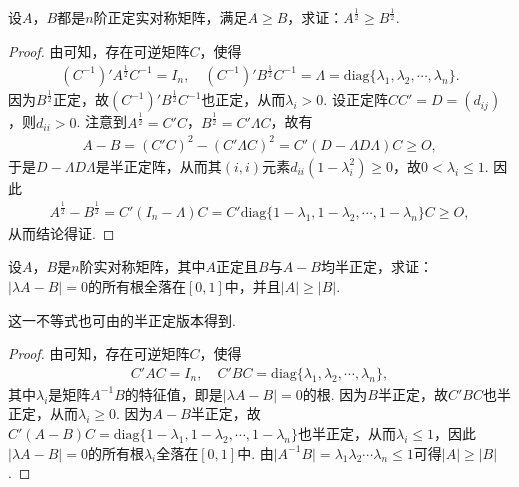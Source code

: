 \documentclass[../../main.tex]{subfiles}%
\begin{document}
\begin{example}\label{example:例9.79}
设\(A\)，\(B\)都是\(n\)阶正定实对称矩阵，满足\(A\geqslant  B\)，求证：\(A^{\frac{1}{2}}\geqslant  B^{\frac{1}{2}}\).
\end{example}
\begin{proof}
由可知，存在可逆矩阵\(C\)，使得
\begin{align*}
(C^{-1})'A^{\frac{1}{2}}C^{-1} = I_n,\quad (C^{-1})'B^{\frac{1}{2}}C^{-1} = \Lambda = \mathrm{diag}\{\lambda_1,\lambda_2,\cdots,\lambda_n\}.
\end{align*}
因为\(B^{\frac{1}{2}}\)正定，故\((C^{-1})'B^{\frac{1}{2}}C^{-1}\)也正定，从而\(\lambda_i>0\). 设正定阵\(CC' = D=(d_{ij})\)，则\(d_{ii}>0\). 注意到\(A^{\frac{1}{2}} = C'C\)，\(B^{\frac{1}{2}} = C'\Lambda C\)，故有
\begin{align*}
A - B=(C'C)^2-(C'\Lambda C)^2 = C'(D - \Lambda D\Lambda)C\geqslant  O,
\end{align*}
于是\(D - \Lambda D\Lambda\)是半正定阵，从而其\((i,i)\)元素\(d_{ii}(1 - \lambda_i^2)\geqslant 0\)，故\(0<\lambda_i\leqslant 1\). 因此
\begin{align*}
A^{\frac{1}{2}} - B^{\frac{1}{2}} = C'(I_n - \Lambda)C = C'\mathrm{diag}\{1 - \lambda_1,1 - \lambda_2,\cdots,1 - \lambda_n\}C\geqslant  O,
\end{align*}
从而结论得证.
\end{proof}

\begin{example}\label{example:例9.80}
设\(A\)，\(B\)是\(n\)阶实对称矩阵，其中\(A\)正定且\(B\)与\(A - B\)均半正定，求证：\(\vert\lambda A - B\vert = 0\)的所有根全落在\([0,1]\)中，并且\(\vert A\vert\geqslant \vert B\vert\).
\end{example}
\begin{remark}
这一不等式也可由的半正定版本得到.
\end{remark}
\begin{proof}
由可知，存在可逆矩阵\(C\)，使得
\begin{align*}
C'AC = I_n,\quad C'BC = \mathrm{diag}\{\lambda_1,\lambda_2,\cdots,\lambda_n\},
\end{align*}
其中\(\lambda_i\)是矩阵\(A^{-1}B\)的特征值，即是\(\vert\lambda A - B\vert = 0\)的根. 因为\(B\)半正定，故\(C'BC\)也半正定，从而\(\lambda_i\geqslant 0\). 因为\(A - B\)半正定，故\(C'(A - B)C = \mathrm{diag}\{1 - \lambda_1,1 - \lambda_2,\cdots,1 - \lambda_n\}\)也半正定，从而\(\lambda_i\leqslant 1\)，因此\(\vert\lambda A - B\vert = 0\)的所有根\(\lambda_i\)全落在\([0,1]\)中. 由\(\vert A^{-1}B\vert=\lambda_1\lambda_2\cdots\lambda_n\leqslant 1\)可得\(\vert A\vert\geqslant \vert B\vert\). 
\end{proof}
\end{document}
